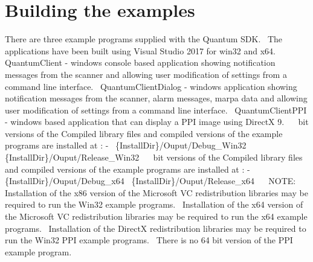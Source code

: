 \hypertarget{page1_build}{}\section{Building the examples}\label{page1_build}
There are three example programs supplied with the Quantum S\+DK.~\newline
The applications have been built using Visual Studio 2017 for win32 and x64.~\newline
Quantum\+Client -\/ windows console based application showing notification messages from the scanner and allowing user modification of settings from a command line interface.~\newline
Quantum\+Client\+Dialog -\/ windows application showing notification messages from the scanner, alarm messages, marpa data and allowing user modification of settings from a command line interface.~\newline
Quantum\+Client\+P\+PI -\/ windows based application that can display a P\+PI image using DirectX 9.~\newline
~ bit versions of the Compiled library files and compiled versions of the example programs are installed at \+: -\/~\newline
\{Install\+Dir\}/\+Ouput/\+Debug\+\_\+\+Win32~\newline
\{Install\+Dir\}/\+Ouput/\+Release\+\_\+\+Win32~\newline
~ bit versions of the Compiled library files and compiled versions of the example programs are installed at \+: -\/~\newline
\{Install\+Dir\}/\+Ouput/\+Debug\+\_\+x64~\newline
\{Install\+Dir\}/\+Ouput/\+Release\+\_\+x64~\newline
~\newline
N\+O\+TE\+:~\newline
Installation of the x86 version of the Microsoft VC redistribution libraries may be required to run the Win32 example programs.~\newline
Installation of the x64 version of the Microsoft VC redistribution libraries may be required to run the x64 example programs.~\newline
Installation of the DirectX redistribution libraries may be required to run the Win32 P\+PI example programs.~\newline
There is no 64 bit version of the P\+PI example program.~\newline
